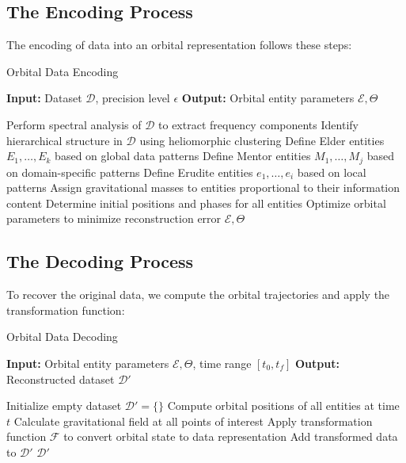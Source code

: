 \subsection{The Encoding Process}

The encoding of data into an orbital representation follows these steps:

\begin{algorithm}[h]
\caption{Orbital Data Encoding}
\begin{algorithmic}[1]
\State \textbf{Input:} Dataset $\mathcal{D}$, precision level $\epsilon$
\State \textbf{Output:} Orbital entity parameters $\mathcal{E}, \Theta$

\State Perform spectral analysis of $\mathcal{D}$ to extract frequency components
\State Identify hierarchical structure in $\mathcal{D}$ using heliomorphic clustering
\State Define Elder entities $E_1, \ldots, E_k$ based on global data patterns
\State Define Mentor entities $M_1, \ldots, M_j$ based on domain-specific patterns
\State Define Erudite entities $e_1, \ldots, e_i$ based on local patterns
\State Assign gravitational masses to entities proportional to their information content
\State Determine initial positions and phases for all entities
\State Optimize orbital parameters to minimize reconstruction error 
\State \Return $\mathcal{E}, \Theta$
\end{algorithmic}
\end{algorithm}

\subsection{The Decoding Process}

To recover the original data, we compute the orbital trajectories and apply the transformation function:

\begin{algorithm}[h]
\caption{Orbital Data Decoding}
\begin{algorithmic}[1]
\State \textbf{Input:} Orbital entity parameters $\mathcal{E}, \Theta$, time range $[t_0, t_f]$
\State \textbf{Output:} Reconstructed dataset $\mathcal{D'}$

\State Initialize empty dataset $\mathcal{D'} = \{\}$
  \State Compute orbital positions of all entities at time $t$
  \State Calculate gravitational field at all points of interest
  \State Apply transformation function $\mathcal{F}$ to convert orbital state to data representation
  \State Add transformed data to $\mathcal{D'}$
\EndFor
\State \Return $\mathcal{D'}$
\end{algorithmic}
\end{algorithm}

